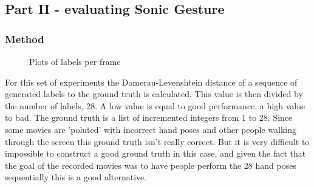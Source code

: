 \subsection{Part II - evaluating Sonic Gesture}

\subsubsection{Method}

\begin{figure}[htbp]
\center{}
\hspace{0.02\linewidth}
\hspace{0.02\linewidth}
\caption{Plots of labels per frame}
\label{fig:performances}
\end{figure}

For this set of experiments the Damerau-Levenshtein distance of a sequence of generated labels to the ground truth is calculated. This value is then divided by the number of labels, 28. A low value is equal to good performance, a high value to bad. The ground truth is a list of incremented integers from 1 to 28. Since some movies are 'poluted' with incorrect hand poses and other people walking through the screen this ground truth isn't really correct. But it is very difficult to impossible to construct a good ground truth in this case, and given the fact that the goal of the recorded movies was to have people perform the 28 hand poses sequentially this is a good alternative. 

